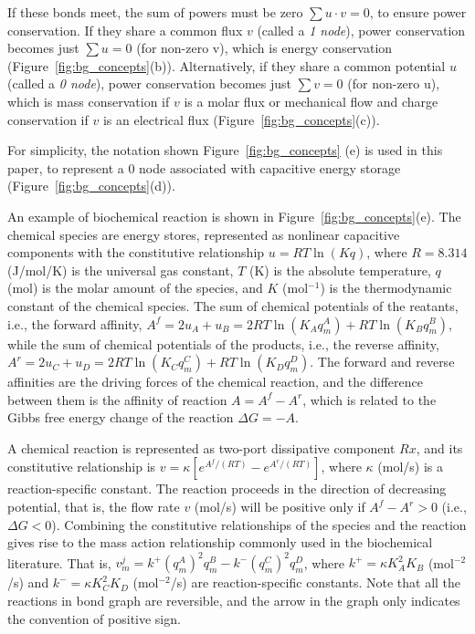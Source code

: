 \documentclass{biophys-new}
\newcommand{\rev}[1]{{\color{black} #1}}
\begin{document}
If these bonds meet, the sum of powers must be zero $\sum u\cdot v=0$, to ensure power conservation. If they share a common flux $v$ (called a \emph{1 node}), power conservation  becomes just $\sum u=0$ (for non-zero v), which is energy conservation (Figure~\ref{fig:bg_concepts}(b)). Alternatively, if they share a common potential $u$ (called a \emph{0 node}), power conservation becomes just $\sum v=0$ (for non-zero u), which is mass conservation if $v$ is a molar flux or mechanical flow and charge conservation if $v$ is an electrical flux (Figure~\ref{fig:bg_concepts}(c)). \rev{For simplicity, the notation shown Figure~\ref{fig:bg_concepts} (e) is used in this paper, to represent a 0 node associated with capacitive energy storage (Figure~\ref{fig:bg_concepts}(d)). 

An example of biochemical reaction is shown in Figure~\ref{fig:bg_concepts}(e). The chemical species are energy stores, represented as nonlinear capacitive components with the constitutive relationship $u=RT\ln (Kq)$, where $R= 8.314$ (J/mol/K) is the universal gas constant, $T$ (K) is the absolute temperature, $q$ (mol) is the molar amount of the species, and $K$ (mol$^{-1}$) is the thermodynamic constant of the chemical species. The sum of chemical potentials of the reatants, i.e., the forward affinity, $A^f=2u_A+u_B=2RT\ln(K_Aq_m^A)+RT\ln(K_Bq_m^B)$, while the sum of chemical potentials of the products, i.e., the reverse affinity, 
$A^r=2u_C+u_D=2RT\ln(K_Cq_m^C)+RT\ln(K_Dq_m^D)$.
The forward and reverse affinities are the driving forces of the chemical reaction, and the difference between them is the affinity of reaction $A=A^f-A^r$, which is related to the Gibbs free energy change of the reaction $\Delta G=-A$.

A chemical reaction is represented as two-port dissipative component $Rx$, and its constitutive relationship is $v=\kappa [e^{A^f/(RT)}-e^{A^r/(RT)}]$, where $\kappa$ (mol/s) is a reaction-specific constant. The reaction proceeds in the direction of decreasing potential, that is, the flow rate $v$ (mol/s) will be positive only if $A^f-A^r>0$ (i.e., $\Delta G <0$). Combining the constitutive relationships of the species and the reaction gives rise to the mass action relationship commonly used in the biochemical literature. That is, $ v_m^j= k^+(q_m^A)^2 q_m^B - k^-(q_m^C)^2 q_m^D$, where $k^+=\kappa K_A^2 K_B$ (mol$^{-2}$/s) and $k^-=\kappa K_C^2 K_D$ (mol$^{-2}$/s) are reaction-specific constants. Note that all the reactions in bond graph are reversible, and the arrow in the graph only indicates the convention of positive sign.} 
\end{document}
